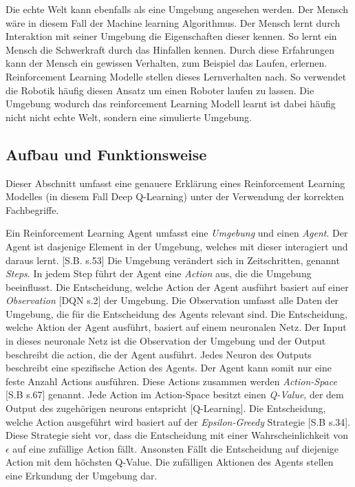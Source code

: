 Die echte Welt kann ebenfalls als eine Umgebung angesehen werden. Der Mensch
wäre in diesem Fall der Machine learning Algorithmus. Der Mensch lernt durch
Interaktion mit seiner Umgebung die Eigenschaften dieser kennen. So lernt ein
Mensch die Schwerkraft durch das Hinfallen kennen. Durch diese Erfahrungen kann
der Mensch ein gewissen Verhalten, zum Beispiel das Laufen, erlernen.
Reinforcement Learning Modelle stellen dieses Lernverhalten nach. So verwendet
die Robotik häufig diesen Ansatz um einen Roboter laufen zu lassen. Die Umgebung
wodurch das reinforcement Learning Modell learnt ist dabei häufig nicht nicht
echte Welt, sondern eine simulierte Umgebung.


\subsection{Aufbau und Funktionsweise}
Dieser Abschnitt umfasst eine genauere Erklärung eines Reinforcement Learning
Modelles (in diesem Fall Deep Q-Learning) unter der Verwendung der korrekten
Fachbegriffe.

Ein Reinforcement Learning Agent umfasst eine \emph{Umgebung} und einen
\emph{Agent}. Der Agent ist dasjenige Element in der Umgebung, welches mit
dieser interagiert und daraus lernt. [S.B. s.53] Die Umgebung verändert sich in
Zeitschritten, genannt \emph{Steps}. In jedem Step führt der Agent eine
\emph{Action} aus, die die Umgebung beeinflusst. Die Entscheidung, welche Action
der Agent ausführt basiert auf einer \emph{Observation} [DQN s.2] der Umgebung. Die
Observation umfasst alle Daten der Umgebung, die für die Entscheidung des Agents
relevant sind. Die Entscheidung, welche Aktion der Agent ausführt, basiert auf
einem neuronalen Netz. Der Input in dieses neuronale Netz ist die Observation
der Umgebung und der Output beschreibt die action, die der Agent ausführt. Jedes
Neuron des Outputs beschreibt eine spezifische Action des Agents. Der Agent kann
somit nur eine feste Anzahl Actions ausführen. Diese Actions zusammen werden
\emph{Action-Space} [S.B s.67] genannt. Jede Action im Action-Space besitzt einen
\emph{Q-Value}, der dem Output des zugehörigen neurons entspricht [Q-Learning]. Die
Entscheidung, welche Action ausgeführt wird basiert auf der
\emph{Epsilon-Greedy} Strategie [S.B s.34]. Diese Strategie sieht vor, dass die
Entscheidung mit einer Wahrscheinlichkeit von $\epsilon$ auf eine zufällige
Action fällt. Ansonsten Fällt die Entscheidung auf diejenige Action mit dem
höchsten Q-Value. Die zufälligen Aktionen des Agents stellen eine Erkundung der
Umgebung dar.

